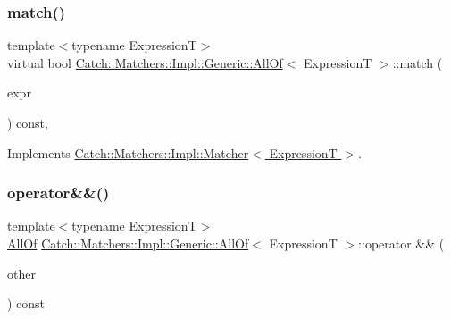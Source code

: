 \subsubsection{\texorpdfstring{match()}{match()}}
{\footnotesize\ttfamily template$<$typename ExpressionT$>$ \\
virtual bool \hyperlink{class_catch_1_1_matchers_1_1_impl_1_1_generic_1_1_all_of}{Catch\+::\+Matchers\+::\+Impl\+::\+Generic\+::\+All\+Of}$<$ ExpressionT $>$\+::match (\begin{DoxyParamCaption}\item[{ExpressionT const \&}]{expr }\end{DoxyParamCaption}) const\hspace{0.3cm}{\ttfamily [inline]}, {\ttfamily [virtual]}}



Implements \hyperlink{struct_catch_1_1_matchers_1_1_impl_1_1_matcher_a8c1c5511ce1f3738a45e6901b558f583}{Catch\+::\+Matchers\+::\+Impl\+::\+Matcher$<$ Expression\+T $>$}.

\hypertarget{class_catch_1_1_matchers_1_1_impl_1_1_generic_1_1_all_of_aca6497aaa7fdb6560ebe850f32ccbf15}{}\label{class_catch_1_1_matchers_1_1_impl_1_1_generic_1_1_all_of_aca6497aaa7fdb6560ebe850f32ccbf15} 
\subsubsection{\texorpdfstring{operator\&\&()}{operator\&\&()}}
{\footnotesize\ttfamily template$<$typename ExpressionT$>$ \\
\hyperlink{class_catch_1_1_matchers_1_1_impl_1_1_generic_1_1_all_of}{All\+Of} \hyperlink{class_catch_1_1_matchers_1_1_impl_1_1_generic_1_1_all_of}{Catch\+::\+Matchers\+::\+Impl\+::\+Generic\+::\+All\+Of}$<$ ExpressionT $>$\+::operator \&\& (\begin{DoxyParamCaption}\item[{\hyperlink{struct_catch_1_1_matchers_1_1_impl_1_1_matcher}{Matcher}$<$ ExpressionT $>$ const \&}]{other }\end{DoxyParamCaption}) const\hspace{0.3cm}{\ttfamily [inline]}}

